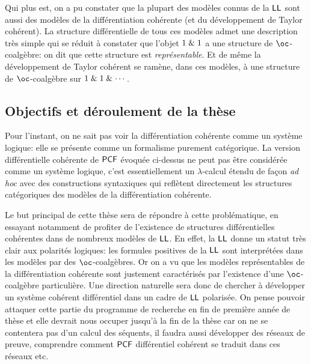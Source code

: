 \documentclass[a4]{article}
\begin{document}
Qui plus est, on a pu constater que la plupart des modèles connus de
la $\hbox{\textsf{LL}}$ sont aussi des modèles de la différentiation cohérente (et du
développement de Taylor cohérent).
%
La structure différentielle de tous ces modèles admet une description
très simple qui se réduit à constater que l'objet ${1}\mathrel{\&}{1}$ a
une structure de $\oc$-coalgèbre: on dit que cette structure est
\emph{représentable}.
%
Et de même la développement de Taylor cohérent se ramène, dans ces
modèles, à une structure de $\oc$-coalgèbre sur
$1\mathrel{\&}1\mathrel{\&}\cdots$.

\subsection*{Objectifs et déroulement de la thèse}
Pour l'instant, on ne sait pas voir la différentiation cohérente comme
un système logique: elle se présente comme un formalisme purement
catégorique.
%
La version différentielle cohérente de $\mathsf{PCF}$ évoquée ci-dessus ne
peut pas être considérée comme un système logique, c'est
essentiellement un $\lambda$-calcul étendu de façon \emph{ad hoc} avec
des constructions syntaxiques qui reflètent directement les structures
catégoriques des modèles de la différentiation cohérente.

Le but principal de cette thèse sera de répondre à cette
problématique, en essayant notamment de profiter de l'existence de
structures différentielles cohérentes dans de nombreux modèles de
$\hbox{\textsf{LL}}$.
%
En effet, la $\hbox{\textsf{LL}}$ donne un statut très clair aux polarités logiques:
les formules positives de la $\hbox{\textsf{LL}}$ sont interprétées dans les modèles
par des $\oc$-coalgèbres.
%
Or on a vu que les modèles représentables de la différentiation
cohérente sont justement caractérisés par l'existence d'une
$\oc$-coalgèbre particulière.
%
Une direction naturelle sera donc de chercher à développer un système
cohérent différentiel dans un cadre de $\hbox{\textsf{LL}}$ polarisée.
%
On pense pouvoir attaquer cette partie du programme de recherche en
fin de première année de thèse et elle devrait nous occuper jusqu'à la
fin de la thèse car on ne se contentera pas d'un calcul des séquents,
il faudra aussi développer des réseaux de preuve, comprendre comment
$\mathsf{PCF}$ différentiel cohérent se traduit dans ces réseaux etc.
\end{document}
